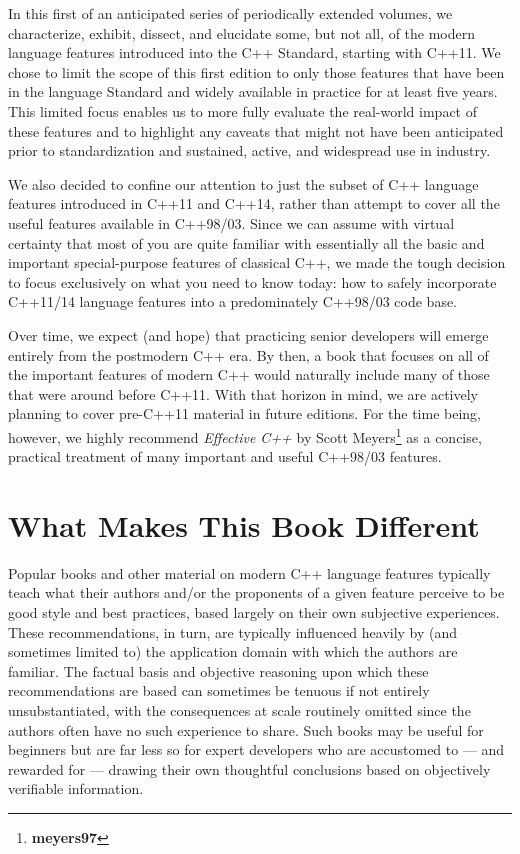 In this first of an anticipated series of periodically extended volumes, we characterize, exhibit, dissect, and elucidate some, but not all, of the modern language features introduced into the C++ Standard, starting with C++11.  We chose to limit the scope of this first edition to only those features that have been in the language Standard and widely available in practice for at least five years. This limited focus enables us to more fully evaluate the real-world impact of these features and to highlight any caveats that might not have been anticipated prior to standardization and sustained, active, and widespread use in industry.

We also decided to confine our attention to just the subset of C++ language features introduced in C++11 and C++14, rather than attempt to cover all the useful features available in C++98/03. Since we can assume with virtual certainty that most of you are quite familiar with essentially all the basic and important special-purpose features of classical C++, we made the tough decision to focus exclusively on what you need to know today: how to safely incorporate C++11/14 language features into a predominately C++98/03 code base.  

Over time, we expect (and hope) that practicing senior developers will emerge entirely from the postmodern C++ era.  By then, a book that focuses on all of the important features of modern C++ would naturally include many of those that were around before C++11. With that horizon in mind, we are actively planning to cover pre-C++11 material in future editions. For the time being, however, we highly recommend \textit{Effective C++} by Scott Meyers\footnote{\textbf{meyers97}} as a concise, practical treatment of many important and useful C++98/03 features.

\section[What Makes This Book Different]{What Makes This Book Different}

Popular books and other material on modern C++ language features typically teach what their authors and/or the proponents of a given feature perceive to be good style and best practices, based largely on their own subjective experiences. These recommendations, in turn, are typically influenced heavily by (and sometimes limited to) the application domain with which the authors are familiar. The factual basis and objective reasoning upon which these recommendations are based can sometimes be tenuous if not entirely unsubstantiated, with the consequences at scale routinely omitted since the authors often have no such experience to share. Such books may be useful for beginners but are far less so for expert developers who are accustomed to --- and rewarded for --- drawing their own thoughtful conclusions based on objectively verifiable information.

